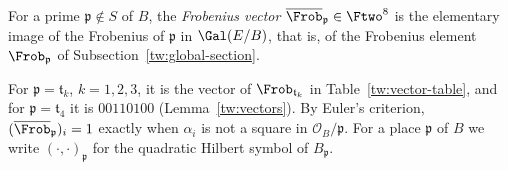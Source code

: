 \begin{definition}\label{gf:frobenius-vector}
For a prime $\mathfrak p\notin S$ of $B$, the \emph{Frobenius vector}
$\overline{\Frob}_{\mathfrak p}\in\Ftwo^8$ is the elementary image of the
Frobenius of $\mathfrak p$ in $\Gal(E/B)$, that is, of the Frobenius element
$\Frob_{\mathfrak p}$ of Subsection~\ref{tw:global-section}.
\end{definition}

For $\mathfrak p=\mathfrak t_k$, $k=1,2,3$, it is the vector of
$\Frob_{\mathfrak t_k}$ in Table~\ref{tw:vector-table}, and for
$\mathfrak p=\mathfrak t_4$ it is $00110100$ (Lemma~\ref{tw:vectors}). By
Euler's criterion,
$(\overline{\Frob}_{\mathfrak p})_i=1$ exactly when $\alpha_i$ is not a
square in $\mathcal O_B/\mathfrak p$. For a
place $\mathfrak p$ of $B$ we write $(\cdot,\cdot)_{\mathfrak p}$ for the
quadratic Hilbert symbol of $B_{\mathfrak p}$.

